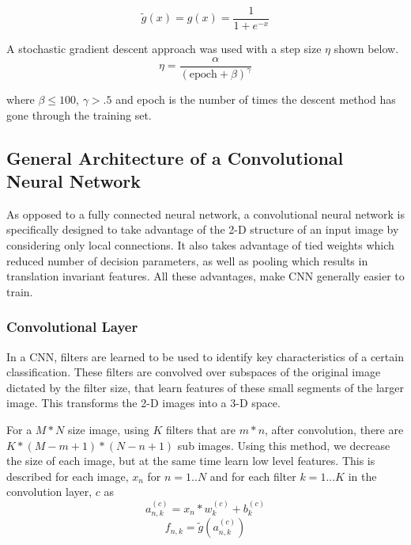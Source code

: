 \documentclass[12pt, twocolumn]{article}
\begin{document}
\begin{equation}
\tilde{g}(x)= g(x) = \frac{1}{ 1+e^{-x}}
\end{equation}

A stochastic gradient descent approach was used with a step size $\eta$ shown below.
\begin{equation}
\eta = \frac{ \alpha}{ (\textrm{epoch} + \beta)^\gamma}
\end{equation}

where $\beta \leq 100$, $\gamma >.5$ and epoch is the number of times the descent method has gone through the training set.  
\newline\newline



\subsection{General Architecture of a Convolutional Neural Network}
As opposed to a fully connected neural network, a convolutional neural network is specifically designed to take advantage of the 2-D structure of an input image by considering only local connections. It also takes advantage of tied weights which reduced number of decision parameters, as well as pooling which results in translation invariant features. All these advantages, make CNN generally easier to train. 



\subsubsection{Convolutional Layer}
In a CNN, filters are learned to be used to identify key characteristics of a certain classification. These filters are convolved over subspaces of the original image dictated by the filter size, that learn features of these small segments of the larger image.  This transforms the 2-D images into a 3-D space.

 For a  $M * N $ size image, using $K$ filters that are $m * n$,  after convolution, there are  $ K * (M - m + 1) * (N - n + 1) $ sub images. Using this method, we decrease the size of each image, but at the same time learn low level features. This is described for each image, $x_n$ for $n=1..N$ and for each filter $k=1...K$ in the convolution layer, $c$ as
\begin{equation}
a_{n,k}^{(c)}= x_n \ast w_k^{(c)} + b_k^{(c)}
\end{equation}
\begin{equation}
f_{n,k}= \tilde{g}(a_{n,k}^{(c)})
\end{equation}
 
\end{document}
